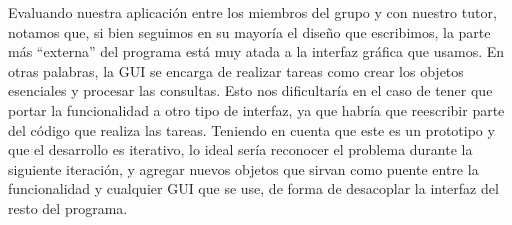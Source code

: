 Evaluando nuestra aplicación entre los miembros del grupo y con nuestro tutor, notamos que, si bien seguimos en su mayoría el diseño que escribimos, la parte más ``externa'' del programa está muy atada a la interfaz gráfica que usamos. En otras palabras, la GUI se encarga de realizar tareas como crear los objetos esenciales y procesar las consultas. Esto nos dificultaría en el caso de tener que portar la funcionalidad a otro tipo de interfaz, ya que habría que reescribir parte del código que realiza las tareas. Teniendo en cuenta que este es un prototipo y que el desarrollo es iterativo, lo ideal sería reconocer el problema durante la siguiente iteración, y agregar nuevos objetos que sirvan como puente entre la funcionalidad y cualquier GUI que se use, de forma de desacoplar la interfaz del resto del programa.